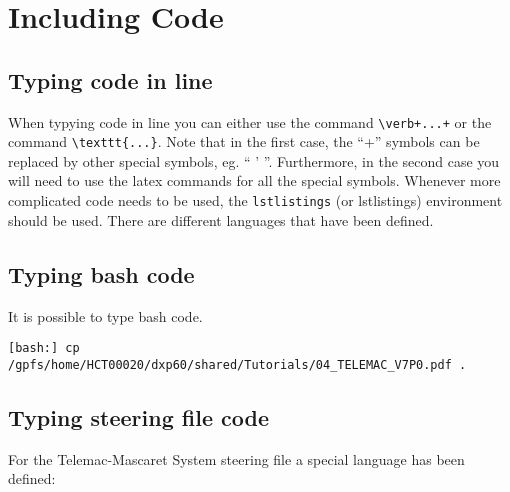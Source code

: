\chapter{Including Code}

\section{Typing code in line}

When typying code in line you can either use the command \verb'\verb+...+' or
the command \texttt{\textbackslash{}texttt\{...\}}. Note that in the first
case, the ``+'' symbols can be replaced by other special symbols, eg. `` ' ''.
Furthermore, in the second case you will need to use the latex commands for all
the special symbols. Whenever more complicated code needs to be used, the
\texttt{lstlistings} (or {\ttfamily lstlistings}) environment should be used.
There are different languages that have been defined.

\section{Typing bash code}

It is possible to type bash code.

\lstset{language=bash,
        basicstyle=\scriptsize\ttfamily}

\begin{lstlisting}[frame=trBL,escapechar=|]
[bash:] cp /gpfs/home/HCT00020/dxp60/shared/Tutorials/04_TELEMAC_V7P0.pdf .
\end{lstlisting}

\section{Typing steering file code}

For the Telemac-Mascaret System steering file a special language has been
defined:

